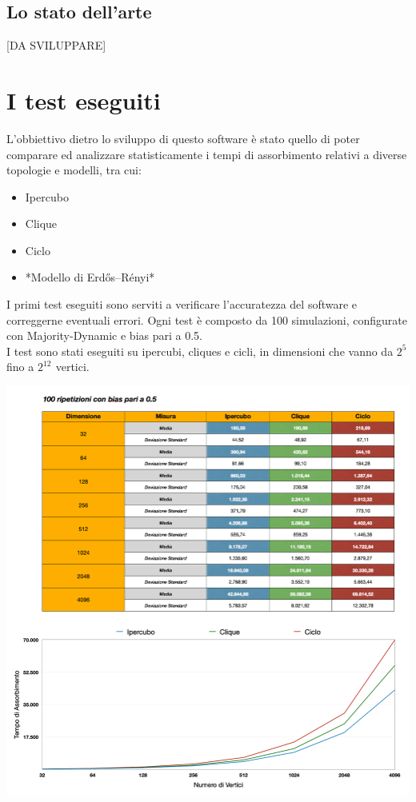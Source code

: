 \documentclass{article}
\begin{document}
\subsection{Lo stato dell'arte}
[DA SVILUPPARE] 

\section{I test eseguiti}
 L'obbiettivo dietro lo sviluppo di questo software è stato quello di poter comparare ed analizzare statisticamente i tempi di assorbimento relativi a diverse topologie e modelli, tra cui:
 \begin{itemize}
\item Ipercubo
\item Clique
\item Ciclo
\item *Modello di Erdős–Rényi*
\end{itemize}
I primi test eseguiti sono serviti a verificare l'accuratezza del software e correggerne eventuali errori. Ogni test è composto da 100 simulazioni, configurate con Majority-Dynamic e bias pari a 0.5.\\
I test sono stati eseguiti su ipercubi, cliques e cicli, in dimensioni che vanno da $2^{5^{\mathrm{}}}$ fino a $2^{12^{\mathrm{}}}$ vertici.\\
\begin{center}
\includegraphics[width=1\textwidth]{test_bias05.png}
\end{center}
\end{document}

